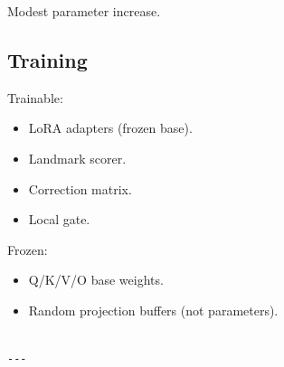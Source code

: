 Modest parameter increase.

\subsection{Training}

Trainable:
\begin{itemize}
\item LoRA adapters (frozen base).
\item Landmark scorer.
\item Correction matrix.
\item Local gate.

\end{itemize}
Frozen:
\begin{itemize}
\item Q/K/V/O base weights.
\item Random projection buffers (not parameters).
\end{itemize}
\begin{lstlisting}

---
\end{lstlisting}